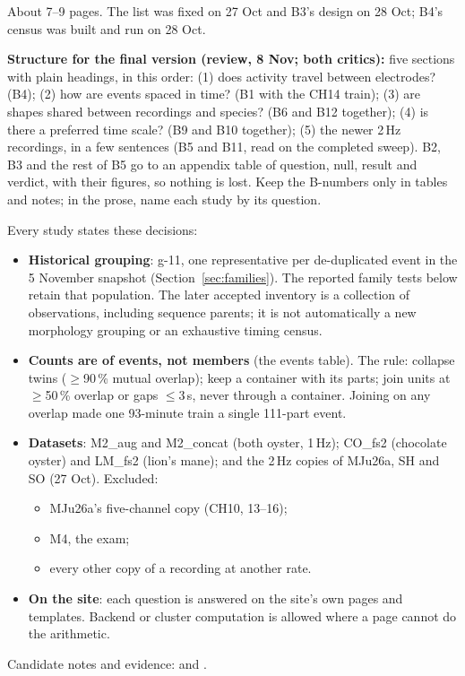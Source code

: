 \begin{instructions}
About 7--9 pages. The list was fixed on 27 Oct and B3's design on 28 Oct; B4's census was built and run on 28 Oct.

\textbf{Structure for the final version (review, 8 Nov; both critics):} five sections with plain headings, in this
order: (1) does activity travel between electrodes? (B4); (2) how are events spaced in time? (B1 with the CH14 train);
(3) are shapes shared between recordings and species? (B6 and B12 together); (4) is there a preferred time scale? (B9
and B10 together); (5) the newer 2\,Hz recordings, in a few sentences (B5 and B11, read on the completed sweep). B2, B3 and
the rest of B5 go to an appendix table of question, null, result and verdict, with their figures, so nothing is lost.
Keep the B-numbers only in tables and notes; in the prose, name each study by its question.

Every study states these decisions:
\begin{itemize}
  \item \textbf{Historical grouping}: g-11, one representative per de-duplicated event in the 5 November snapshot
        (Section~\ref{sec:families}). The reported family tests below retain that population. The later accepted
        inventory is a collection of observations, including sequence parents; it is not automatically a new
        morphology grouping or an exhaustive timing census.
  \item \textbf{Counts are of events, not members} (the events table). The rule: collapse twins ($\ge$90\,\% mutual
        overlap); keep a container with its parts; join units at $\ge$50\,\% overlap or gaps $\le$3\,s, never through a
        container. Joining on any overlap made one 93-minute train a single 111-part event.
  \item \textbf{Datasets}: M2\_aug and M2\_concat (both oyster, 1\,Hz); CO\_fs2 (chocolate oyster) and
        LM\_fs2 (lion's mane); and the 2\,Hz copies of
        MJu26a, SH and SO (27 Oct). Excluded:
        \begin{itemize}
          \item MJu26a's five-channel copy (CH10, 13--16);
          \item M4, the exam;
          \item every other copy of a recording at another rate.
        \end{itemize}
  \item \textbf{On the site}: each question is answered on the site's own pages and templates. Backend or cluster
        computation is allowed where a page cannot do the arithmetic.
\end{itemize}
Candidate notes and evidence:  and .


\end{instructions}
